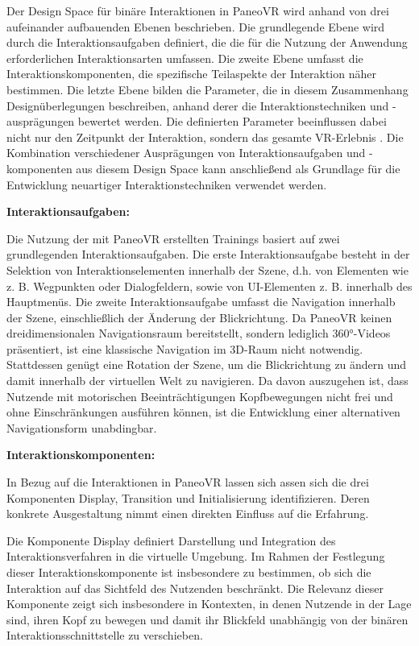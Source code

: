 Der Design Space für binäre Interaktionen in PaneoVR wird anhand von drei aufeinander aufbauenden Ebenen beschrieben. Die grundlegende Ebene wird durch die Interaktionsaufgaben definiert, die die für die Nutzung der Anwendung erforderlichen Interaktionsarten umfassen. Die zweite Ebene umfasst die Interaktionskomponenten, die spezifische Teilaspekte der Interaktion näher bestimmen. Die letzte Ebene bilden die Parameter, die in diesem Zusammenhang Designüberlegungen beschreiben, anhand derer die Interaktionstechniken und -ausprägungen bewertet werden. Die definierten Parameter beeinflussen dabei nicht nur den Zeitpunkt der Interaktion, sondern das gesamte VR-Erlebnis \citep{10.1145/3441852.3471230}. Die Kombination verschiedener Ausprägungen von Interaktionsaufgaben und -komponenten aus diesem Design Space kann anschließend als Grundlage für die Entwicklung neuartiger Interaktionstechniken verwendet werden.

{\normalfont \bfseries Interaktionsaufgaben:}  

Die Nutzung der mit PaneoVR erstellten Trainings basiert auf zwei grundlegenden Interaktionsaufgaben. Die erste Interaktionsaufgabe besteht in der Selektion von Interaktionselementen innerhalb der Szene, d.h. von Elementen wie z. B.  Wegpunkten oder Dialogfeldern, sowie von UI-Elementen z. B. innerhalb des Hauptmenüs. Die zweite Interaktionsaufgabe umfasst die Navigation innerhalb der Szene, einschließlich der Änderung der Blickrichtung. Da PaneoVR keinen dreidimensionalen Navigationsraum bereitstellt, sondern lediglich 360°-Videos präsentiert, ist eine klassische Navigation im 3D-Raum nicht notwendig. Stattdessen genügt eine Rotation der Szene, um die Blickrichtung zu ändern und damit innerhalb der virtuellen Welt zu navigieren. Da davon auszugehen ist, dass Nutzende mit motorischen Beeinträchtigungen Kopfbewegungen nicht frei und ohne Einschränkungen ausführen können, ist die Entwicklung einer alternativen Navigationsform unabdingbar. 

{\normalfont \bfseries Interaktionskomponenten:} 

In Bezug auf die Interaktionen in PaneoVR lassen sich assen sich die drei Komponenten Display, Transition und Initialisierung identifizieren. Deren konkrete Ausgestaltung nimmt einen direkten Einfluss auf die Erfahrung. 

Die Komponente Display definiert Darstellung und Integration des Interaktionsverfahren in die virtuelle Umgebung. Im Rahmen der Festlegung dieser Interaktionskomponente ist insbesondere zu bestimmen, ob sich die Interaktion auf das Sichtfeld des Nutzenden beschränkt. Die Relevanz dieser Komponente zeigt sich insbesondere in Kontexten, in denen Nutzende in der Lage sind, ihren Kopf zu bewegen und damit ihr Blickfeld unabhängig von der binären Interaktionsschnittstelle zu verschieben.

